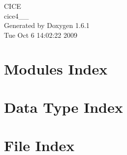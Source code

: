 \documentclass[a4paper]{book}
\begin{document}
\hypersetup{pageanchor=false}
\begin{titlepage}
\vspace*{7cm}
\begin{center}
{\Large CICE \\[1ex]\large cice4\_\_ }\\
\vspace*{1cm}
{\large Generated by Doxygen 1.6.1}\\
\vspace*{0.5cm}
{\small Tue Oct 6 14:02:22 2009}\\
\end{center}
\end{titlepage}
\clearemptydoublepage
{}
\tableofcontents
\clearemptydoublepage
{}
\hypersetup{pageanchor=true}
\chapter{Modules Index}

\chapter{Data Type Index}

\chapter{File Index}

\end{document}
